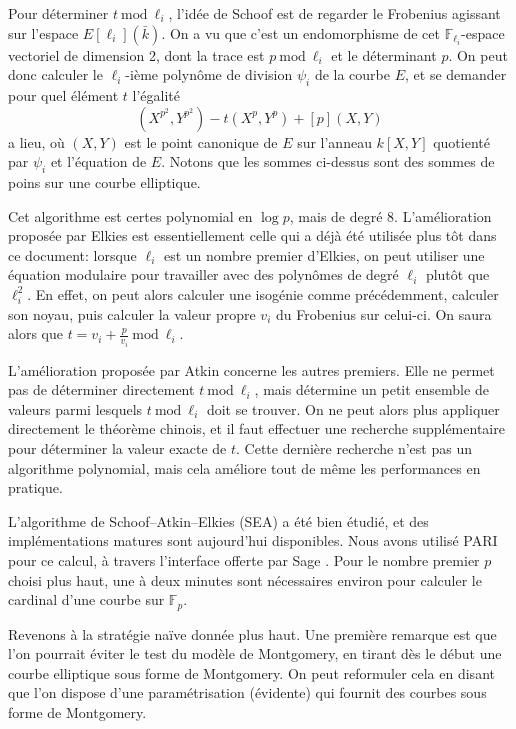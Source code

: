 \documentclass[11pt,a4paper]{article}
\newcommand{\F}{\mathbb{F}}
\renewcommand{\mod}{\ \mathrm{mod}\ }
\renewcommand{\v}{\vspace{5mm}}
\theoremstyle{definition}
\begin{document}
Pour déterminer $t \mod \ell_i$, l'idée de Schoof est de regarder le Frobenius agissant sur l'espace $E[\ell_i](\bar{k})$. On a vu que c'est un endomorphisme de cet $\F_{\ell_i}$-espace vectoriel de dimension 2, dont la trace est $p\mod \ell_i$ et le déterminant $p$. On peut donc calculer le $\ell_i$-ième polynôme de division $\psi_i$ de la courbe $E$, et se demander pour quel élément $t$ l'égalité
$$(X^{p^2}, Y^{p^2}) - t (X^p, Y^p) + [p] (X, Y)$$
a lieu, où $(X, Y)$ est le point canonique de $E$ sur l'anneau $k[X, Y]$ quotienté par $\psi_i$ et l'équation de $E$. Notons que les sommes ci-dessus sont des sommes de poins sur une courbe elliptique. 

Cet algorithme est certes polynomial en $\log p$, mais de degré 8. L'amélioration proposée par Elkies est essentiellement celle qui a déjà été utilisée plus tôt dans ce document: lorsque $\ell_i$ est un nombre premier d'Elkies, on peut utiliser une équation modulaire pour travailler avec des polynômes de degré $\ell_i$ plutôt que $\ell_i^2$. En effet, on peut alors calculer une isogénie comme précédemment, calculer son noyau, puis calculer la valeur propre $v_i$ du Frobenius sur celui-ci. On saura alors que $t = v_i + \frac{p}{v_i} \mod \ell_i$.

L'amélioration proposée par Atkin concerne les autres premiers. Elle ne permet pas de déterminer directement $t \mod \ell_i$, mais détermine un petit ensemble de valeurs parmi lesquels $t \mod\ell_i$ doit se trouver. On ne peut alors plus appliquer directement le théorème chinois, et il faut effectuer une recherche supplémentaire pour déterminer la valeur exacte de $t$. Cette dernière recherche n'est pas un algorithme polynomial, mais cela améliore tout de même les performances en pratique.

L'algorithme de Schoof--Atkin--Elkies (SEA) a été bien étudié, et des implémentations matures sont aujourd'hui disponibles. Nous avons utilisé PARI \cite{PARI} pour ce calcul, à travers l'interface offerte par Sage \cite{Sage}. Pour le nombre premier $p$ choisi plus haut, une à deux minutes sont nécessaires environ pour calculer le cardinal d'une courbe sur $\F_p$.

\v
Revenons à la stratégie naïve donnée plus haut. Une première remarque est que l'on pourrait éviter le test du modèle de Montgomery, en tirant dès le début une courbe elliptique sous forme de Montgomery. On peut reformuler cela en disant que l'on dispose d'une paramétrisation (évidente) qui fournit des courbes sous forme de Montgomery.
\end{document}
